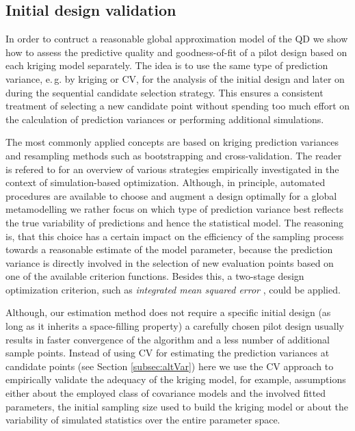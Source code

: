 \documentclass[article, nojss]{jss}
\numberwithin{equation}{section}			%
\begin{document}
\subsection{Initial design validation}\label{sec:design}
In order to contruct a reasonable global approximation model of the QD we show how
to assess the predictive quality and goodness-of-fit of a pilot design based on
each kriging model separately. The idea is to use the same type of prediction
variance, e.\,g. by kriging or CV, for the analysis of the initial design and
later on during the sequential candidate selection strategy. This ensures a
consistent treatment of selecting a new candidate point without spending too much effort on
the calculation of prediction variances or performing additional
simulations.\par
%
The most commonly applied concepts are based on kriging prediction variances and resampling methods
such as bootstrapping and cross-validation. The reader is refered to
\citet{ref:Sacksb1989} for an overview of various strategies empirically investigated in the context
of simulation-based optimization. Although, in principle, automated procedures
are available to choose and augment a design optimally for a global
metamodelling \citep[see e.\,g.][sect.~6]{mueller2001} we rather focus
on which type of prediction variance best reflects the true variability of predictions and
hence the statistical model. The reasoning is, that this choice has a certain impact on the
efficiency of the sampling process towards a reasonable estimate of the model parameter, because
the prediction variance is directly involved in the selection of new evaluation
points based on one of the available criterion functions. Besides this, a
two-stage design optimization criterion, such as \emph{integrated mean squared error}
\citep[see, e.\,g.][]{ref:Sacksa1989}, could be applied.\par
%
Although, our estimation method does not require a specific initial design (as
long as it inherits a space-filling property) a carefully chosen pilot design
usually results in faster convergence of the algorithm and a less number of
additional sample points. Instead of using CV for estimating the prediction
variances at candidate points (see Section \ref{subsec:altVar}) here we use the
CV approach to empirically validate the adequacy of the kriging model, for example, assumptions
either about the employed class of covariance models and the involved
fitted parameters, the initial sampling size used to build the kriging model or
about the variability of simulated statistics over the entire parameter space.
\end{document}

